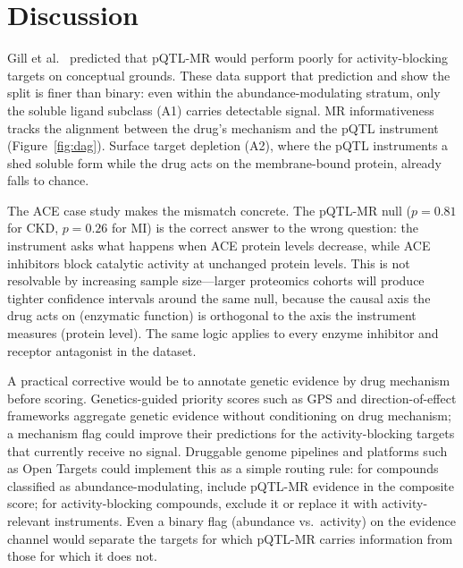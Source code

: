 \documentclass[11pt]{article}
\begin{document}
\section{Discussion}
\label{sec:discussion}

Gill et al.\ \cite{gill2021mendelian} predicted that pQTL-MR would perform poorly for activity-blocking targets on conceptual grounds. These data support that prediction and show the split is finer than binary: even within the abundance-modulating stratum, only the soluble ligand subclass (A1) carries detectable signal. MR informativeness tracks the alignment between the drug's mechanism and the pQTL instrument (Figure~\ref{fig:dag}). Surface target depletion (A2), where the pQTL instruments a shed soluble form while the drug acts on the membrane-bound protein, already falls to chance.

The ACE case study makes the mismatch concrete. The pQTL-MR null ($p = 0.81$ for CKD, $p = 0.26$ for MI) is the correct answer to the wrong question: the instrument asks what happens when ACE protein levels decrease, while ACE inhibitors block catalytic activity at unchanged protein levels. This is not resolvable by increasing sample size---larger proteomics cohorts will produce tighter confidence intervals around the same null, because the causal axis the drug acts on (enzymatic function) is orthogonal to the axis the instrument measures (protein level). The same logic applies to every enzyme inhibitor and receptor antagonist in the dataset.

A practical corrective would be to annotate genetic evidence by drug mechanism before scoring. Genetics-guided priority scores such as GPS \cite{duffy2024gps} and direction-of-effect frameworks \cite{chen2025direction} aggregate genetic evidence without conditioning on drug mechanism; a mechanism flag could improve their predictions for the activity-blocking targets that currently receive no signal. Druggable genome pipelines \cite{finan2017druggable} and platforms such as Open Targets could implement this as a simple routing rule: for compounds classified as abundance-modulating, include pQTL-MR evidence in the composite score; for activity-blocking compounds, exclude it or replace it with activity-relevant instruments. Even a binary flag (abundance vs.\ activity) on the evidence channel would separate the targets for which pQTL-MR carries information from those for which it does not.
\end{document}
